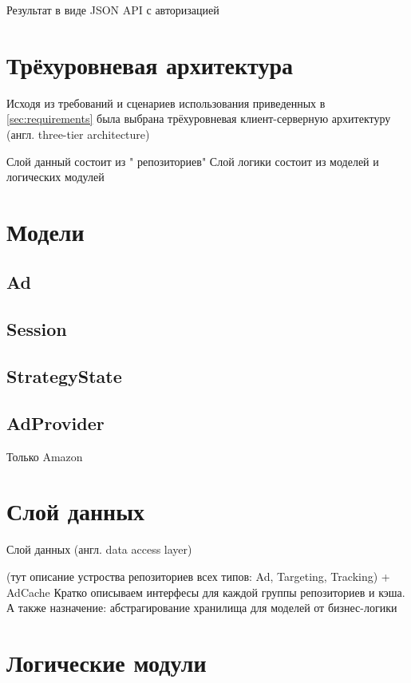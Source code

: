 \documentclass[times]{itmo-student-thesis}
\begin{document}
Результат в виде JSON API с авторизацией 

\section{Трёхуровневая архитектура}

Исходя из требований и сценариев использования приведенных в \ref{sec:requirements} была выбрана трёхуровневая клиент-серверную архитектуру (англ. three-tier architecture) \cite{three-tier-architecture}

Слой данный состоит из " репозиториев"
Слой логики состоит из моделей и логических модулей

\section{Модели}

\subsection{Ad}

\subsection{Session}

\subsection{StrategyState}

\subsection{AdProvider}
Только Amazon

\section{Слой данных}

Слой данных (англ. data access layer) \cite{data-access-layer}

(тут описание устроства репозиториев всех типов: Ad, Targeting, Tracking) + AdCache
Кратко описываем интерфесы для каждой группы репозиториев и кэша. А также назначение: абстрагирование хранилища для моделей от бизнес-логики

\section{Логические модули}
\end{document}
